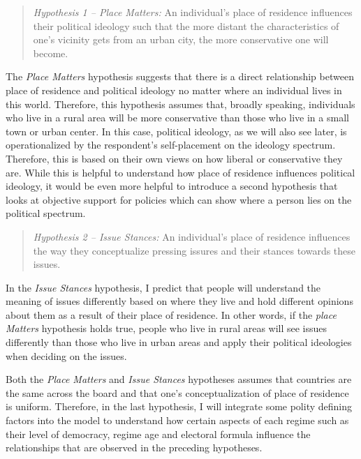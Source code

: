 \documentclass[12pt, titlepage]{article}
\newcommand\e{\emph}
\begin{document}
\begin{quote}
	\e {Hypothesis 1 -- Place Matters:} An individual's place of residence influences their political ideology such that the more distant the characteristics of one's vicinity gets from an urban city, the more conservative one will become.
\end{quote}

The \e{Place Matters} hypothesis suggests that there is a direct relationship between place of residence and political ideology no matter where an individual lives in this world. Therefore, this hypothesis assumes that, broadly speaking, individuals who live in a rural area will be more conservative than those who live in a small town or urban center. In this case, political ideology, as we will also see later, is operationalized by the respondent's self-placement on the ideology spectrum. Therefore, this is based on their own views on how liberal or conservative they are. While this is helpful to understand how place of residence influences political ideology, it would be even more helpful to introduce a second hypothesis that looks at objective support for policies which can show where a person lies on the political spectrum.

\begin{quote}
	\e{Hypothesis 2 -- Issue Stances:} An individual's place of residence influences the way they conceptualize pressing issures and their stances towards these issues.
\end{quote}

In the \e{Issue Stances} hypothesis, I predict that people will understand the meaning of issues differently based on where they live and hold different opinions about them as a result of their place of residence. In other words, if the \e{place Matters} hypothesis holds true, people who live in rural areas will see issues differently than those who live in urban areas and apply their political ideologies when deciding on the issues. 

Both the \e{Place Matters} and \e{Issue Stances} hypotheses assumes that countries are the same across the board and that one's conceptualization of place of residence is uniform. Therefore, in the last hypothesis, I will integrate some polity defining factors into the model to understand how certain aspects of each regime such as their level of democracy, regime age and electoral formula influence the relationships that are observed in the preceding hypotheses. 
\end{document}
